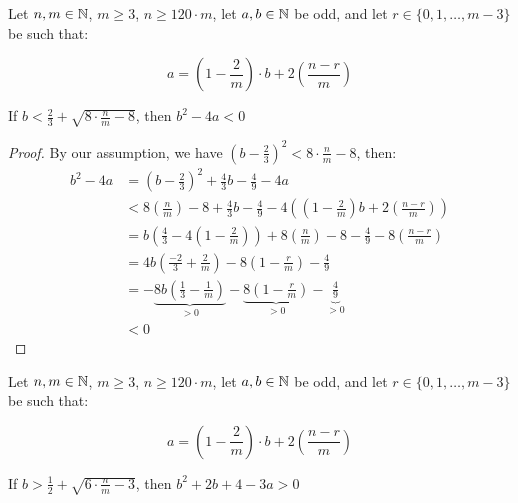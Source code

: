 %
%

\begin{lemma}
    \label{lem:b2leq4a}
    
    Let $n,m\in \mathbb{N}$, $m\geq 3$, $n\geq 120\cdot m$, let $a,b\in\mathbb{N}$ be odd, and let $r\in\{0,1,\dots,m-3\}$ be such that:

    \[
        a=\left(1-\frac{2}{m}\right)\cdot b + 2\left(\frac{n-r}{m}\right)
    \]

    If $b<\frac{2}{3} + \sqrt{8\cdot\frac{n}{m} - 8}$, then $b^2-4a<0$
\end{lemma}

\begin{proof}
    By our assumption, we have $\left(b-\frac{2}{3}\right)^2 < 8\cdot\frac{n}{m} - 8$, then:
    \begin{align}
        b^2-4a &= \left(b-\frac{2}{3}\right)^2 + \frac{4}{3}b - \frac{4}{9} - 4a \\
        &<8\left(\frac{n}{m}\right) - 8 + \frac{4}{3}b - \frac{4}{9} - 4\left(\left(1-\frac{2}{m}\right)b + 2\left(\frac{n-r}{m}\right)\right) \\
        &= b\left(\frac{4}{3} - 4\left(1-\frac{2}{m}\right)\right) + 8\left(\frac{n}{m}\right) - 8 - \frac{4}{9} - 8\left(\frac{n-r}{m}\right) \\
        &= 4b\left(\frac{-2}{3} +\frac{2}{m}\right) - 8\left(1 - \frac{r}{m}\right) - \frac{4}{9} \\
        &= -\underbrace{8b\left(\frac{1}{3} -\frac{1}{m}\right)}_{>0} - \underbrace{8\left(1 - \frac{r}{m}\right)}_{>0} - \underbrace{\frac{4}{9}}_{>0} \\
        &<0
    \end{align}
\end{proof}

%
%

\begin{lemma}
    \label{lem:b22b43a}
    
    Let $n,m\in \mathbb{N}$, $m\geq 3$, $n\geq 120\cdot m$, let $a,b\in\mathbb{N}$ be odd, and let $r\in\{0,1,\dots,m-3\}$ be such that:

    \[
        a=\left(1-\frac{2}{m}\right)\cdot b + 2\left(\frac{n-r}{m}\right)
    \]

    If $b>\frac{1}{2} + \sqrt{6\cdot\frac{n}{m} - 3}$, then $b^2+2b+4-3a>0$
\end{lemma}


